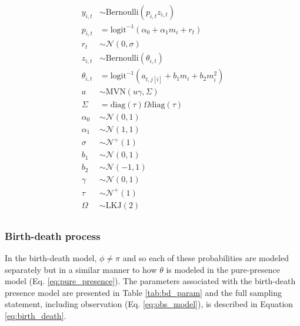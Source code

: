 \documentclass[12pt,letterpaper]{article}
\begin{document}
\begin{equation}
  \begin{aligned}
    y_{i, t} &\sim \text{Bernoulli}(p_{i, t} z_{i, t}) \\
    p_{i, t} &= \text{logit}^{-1}(\alpha_{0} + \alpha_{1} m_{i} + r_{t}) \\ 
    r_{t} &\sim \mathcal{N}(0, \sigma) \\
    z_{i, t} &\sim \text{Bernoulli}(\theta_{i, t}) \\
    \theta_{i, t} &= \text{logit}^{-1}(a_{t, j[i]} + b_{1} m_{i} + b_{2} m_{i}^{2}) \\
    a &\sim \text{MVN}(u \gamma, \Sigma) \\
    \Sigma &= \text{diag}(\tau) \Omega \text{diag}(\tau) \\
    \alpha_{0} &\sim \mathcal{N}(0, 1) \\
    \alpha_{1} &\sim \mathcal{N}(1, 1) \\
    \sigma &\sim \mathcal{N}^{+}(1) \\
    b_{1} &\sim \mathcal{N}(0, 1) \\
    b_{2} &\sim \mathcal{N}(-1, 1) \\
    \gamma &\sim \mathcal{N}(0, 1) \\
    \tau &\sim \mathcal{N}^{+}(1) \\
    \Omega &\sim \text{LKJ}(2) \\
  \end{aligned}
  \label{eq:pure_presence}
\end{equation}


\subsubsection*{Birth-death process}
In the birth-death model, \(\phi \neq \pi\) and so each of these probabilities are modeled separately but in a similar manner to how \(\theta\) is modeled in the pure-presence model (Eq. \ref{eq:pure_presence}). The parameters associated with the birth-death presence model are presented in Table \ref{tab:bd_param} and the full sampling statement, including observation (Eq. \ref{eq:obs_model}), is described in Equation \ref{eq:birth_death}. 
\end{document}
